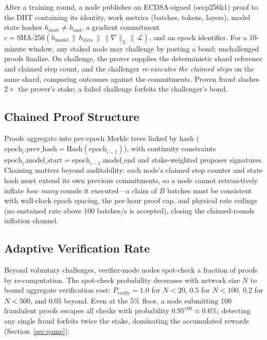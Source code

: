\documentclass[conference]{IEEEtran}
\begin{document}
After a training round, a node publishes an ECDSA-signed (secp256k1) proof to the DHT containing its identity, work metrics (batches, tokens, layers), model state hashes $h_{\text{start}} \neq h_{\text{end}}$, a gradient commitment $c = \text{SHA-256}(h_{\text{model}} \,\|\, h_{\text{data}} \,\|\, \|\nabla\|_2 \,\|\, \mathcal{L})$, and an epoch identifier. For a 10-minute window, any staked node may challenge by posting a bond; unchallenged proofs finalize. On challenge, the prover supplies the deterministic shard reference and claimed step count, and the challenger \emph{re-executes the claimed steps} on the same shard, comparing outcomes against the commitments. Proven fraud slashes $2\times$ the prover's stake; a failed challenge forfeits the challenger's bond.

\subsection{Chained Proof Structure}

Proofs aggregate into per-epoch Merkle trees linked by hash ($\text{epoch}_i.\text{prev\_hash} = \text{Hash}(\text{epoch}_{i-1})$), with continuity constraints $\text{epoch}_i.\text{model\_start} = \text{epoch}_{i-1}.\text{model\_end}$ and stake-weighted proposer signatures. Chaining matters beyond auditability: each node's claimed step counter and state hash must extend its own previous commitments, so a node cannot retroactively inflate \emph{how many} rounds it executed---a claim of $B$ batches must be consistent with wall-clock epoch spacing, the per-hour proof cap, and physical rate ceilings (no sustained rate above 100 batches/s is accepted), closing the claimed-rounds inflation channel.

\subsection{Adaptive Verification Rate}
\label{sec:adaptive}

Beyond voluntary challenges, verifier-mode nodes spot-check a fraction of proofs by re-computation. The spot-check probability decreases with network size $N$ to bound aggregate verification cost: $P_{\text{verify}} = 1.0$ for $N{<}20$, $0.5$ for $N{<}100$, $0.2$ for $N{<}500$, and $0.05$ beyond. Even at the 5\% floor, a node submitting 100 fraudulent proofs escapes all checks with probability $0.95^{100} \approx 0.6\%$; detecting any single fraud forfeits twice the stake, dominating the accumulated rewards (Section~\ref{sec:game}).
\end{document}
